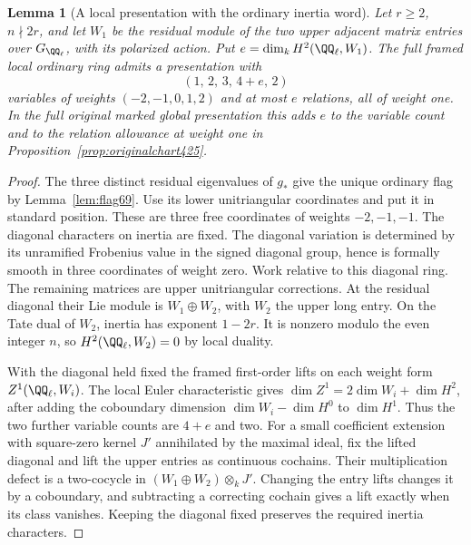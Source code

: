 \documentclass[a4paper,11pt]{article}
\newtheorem{lemma}[proposition]{Lemma}
\theoremstyle{definition}
\theoremstyle{remark}
\numberwithin{equation}{section}
\begin{document}
\begin{lemma}[A local presentation with the ordinary inertia word]\leavevmode
\label{lem:ordinaryrelations427}
Let \(r\ge2\), \(n\nmid 2r\), and let \(W_1\) be the residual
module of the two upper adjacent matrix entries over
\(G_{\QQ_\ell}\), with its polarized action. Put
\(e=\dim_k H^2(\QQ_\ell,W_1)\). The full framed local ordinary
ring admits a presentation with
\[
    (1,\,2,\,3,\,4+e,\,2)
\]
variables of weights \((-2,-1,0,1,2)\) and at most \(e\)
relations, all of weight one. In the full original marked
global presentation this adds \(e\) to the variable count
and to the relation allowance at weight one in
Proposition~\ref{prop:originalchart425}.
\end{lemma}
\begin{proof}
The three distinct residual eigenvalues of \(g_*\) give the
unique ordinary flag by Lemma~\ref{lem:flag69}. Use its lower
unitriangular coordinates and put it in standard position.
These are three free coordinates of weights \(-2,-1,-1\).
The diagonal characters on inertia are fixed. The diagonal
variation is determined by its unramified Frobenius value
in the signed diagonal group, hence is formally smooth in
three coordinates of weight zero. Work relative to this
diagonal ring. The remaining matrices are upper unitriangular
corrections. At the residual diagonal their Lie module is
\(W_1\oplus W_2\), with \(W_2\) the upper long entry.
On the Tate dual of \(W_2\), inertia has exponent \(1-2r\).
It is nonzero modulo the even integer \(n\), so
\(H^2(\QQ_\ell,W_2)=0\) by local duality.

With the diagonal held fixed the framed first-order lifts
on each weight form \(Z^1(\QQ_\ell,W_i)\). The local Euler
characteristic gives
\(\dim Z^1=2\dim W_i+\dim H^2\), after adding the coboundary
dimension \(\dim W_i-\dim H^0\) to \(\dim H^1\).
Thus the two further variable counts are \(4+e\) and two.
For a small coefficient extension with square-zero kernel \(J'\)
annihilated by the maximal ideal, fix the lifted diagonal
and lift the upper entries as continuous cochains. Their
multiplication defect is a two-cocycle in
\((W_1\oplus W_2)\otimes_k J'\). Changing the entry lifts
changes it by a coboundary, and subtracting a correcting
cochain gives a lift exactly when its class vanishes. Keeping
the diagonal fixed preserves the required inertia characters.


\end{proof}
\end{document}
